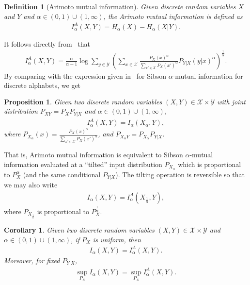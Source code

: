 \documentclass{article}
\numberwithin{theorem}{section}
\newtheorem{corollary}[theorem]{Corollary}
\numberwithin{example}{section}
\numberwithin{remark}{section}
\newtheorem{definition}{Definition}
\numberwithin{definition}{section}
\newtheorem{proposition}[theorem]{Proposition}
\newcommand{\X}{\mathcal{X}}
\newcommand{\Y}{\mathcal{Y}}
\newcommand{\ds}{\displaystyle}
\newcommand{\range}{(0,1) \cup (1,\infty)}
\begin{document}
\begin{definition}[Arimoto mutual information] \label{def:arimoto}
    Given discrete random variables $X$ and $Y$ and $\alpha \in (0,1) \cup (1,\infty)$, the Arimoto mutual information is defined as
    \begin{align} \label{eq:def-arimoto}
        I^A_\alpha (X,Y)  = H_\alpha(X) - H_\alpha(X|Y). 
    \end{align}
\end{definition}
It follows directly from~ that
\begin{align}
    \label{eq:arimotoMI-expanded}
    I^A_\alpha(X,Y) =  \frac{\alpha}{\alpha-1} \log \sum_{y \in \Y} \left( \sum_{x\in \X} \frac{P_{X}(x)^\alpha }{ \sum_{x' \in \X} P_X (x')^\alpha } P_{Y|X}(y|x)^\alpha \right)^{\frac{1}{\alpha}}.
\end{align}
By comparing with the expression given in~ for Sibson $\alpha$-mutual information for discrete alphabets, we get
\begin{proposition} \label{prop:arimoto-sibson-tilted}
    Given two discrete random variables $(X,Y) \in \X \times \Y$ with joint distribution $P_{XY} = P_X P_{Y|X}$ and $\alpha \in \range$,
    \begin{align} \label{eq:prop-arimoto-sibson-tilted}
        I_\alpha^A(X,Y) = I_\alpha( X_\alpha, Y),
    \end{align}
    where $ \ds P_{X_\alpha} (x) = \frac{P_X(x)^\alpha}{\sum_{x' \in \X} P_X(x')^\alpha} $, and $P_{X_\alpha Y} = P_{X_\alpha} P_{Y|X}$.
\end{proposition}
That is, Arimoto mutual information is equivalent to Sibson $\alpha$-mutual information evaluated at a ``tilted'' input distribution $P_{X_\alpha}$ which is proportional to $P_X^\alpha$ (and the same conditional $P_{Y|X}$). The tilting operation is reversible so that we may also write
\begin{align}
    I_\alpha(X,Y) = I^A_\alpha (X_{\frac{1}{\alpha}},Y),
\end{align}
where $P_{X_{\frac{1}{\alpha}}}$ is proportional to $P_X^\frac{1}{\alpha}$.
\begin{corollary} \label{corr:arimoto-sibson-equality}
    Given two discrete random variables $(X,Y) \in \X \times \Y$ and $\alpha \in \range$, if $P_X$ is uniform, then
    \begin{align}
        \label{eq:corr-arimoto-sibson-equality-unif}
        I_\alpha(X,Y) = I_\alpha^A(X,Y).
    \end{align}
    Moreover, for fixed $P_{Y|X}$,
    \begin{align}
        \sup_{P_X} I_\alpha (X,Y) = \sup_{P_X} I_\alpha^A(X,Y).
    \end{align}
\end{corollary}
\end{document}
